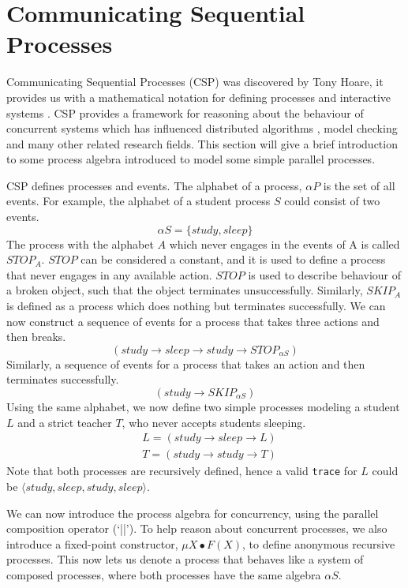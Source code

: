 \section{Communicating Sequential Processes} \label{csp_section}
Communicating Sequential Processes (CSP) was discovered by Tony Hoare, it provides us with a mathematical notation for defining processes and interactive systems \cite{csp_paper}. CSP provides a framework for reasoning about the behaviour of concurrent systems which has influenced distributed algorithms \cite{distributed_algorithms_na_lynch}, model checking \cite{model_checking} and many other related research fields. This section will give a brief introduction to some process algebra introduced to model some simple parallel processes.
\par
CSP defines processes and events. The alphabet of a process, $\alpha P$ is the set of all events. For example, the alphabet of a student process $S$ could consist of two events.
\[
\alpha S = \{study, sleep\}
\]
The process with the alphabet $A$ which never engages in the events of A is called $STOP_A$. $STOP$ can be considered a constant, and it is used to define a process that never engages in any available action. $STOP$ is used to describe behaviour of a broken object, such that the object terminates unsuccessfully. Similarly, $SKIP_A$ is defined as a process which does nothing but terminates successfully. We can now construct a sequence of events for a process that takes three actions and then breaks.
\[
(study \rightarrow sleep \rightarrow study \rightarrow STOP_{\alpha S})
\]
Similarly, a sequence of events for a process that takes an action and then terminates successfully.
\[
(study \rightarrow SKIP_{\alpha S})
\]
Using the same alphabet, we now define two simple processes modeling a student $L$ and a strict teacher $T$, who never accepts students sleeping.
\[
\begin{aligned}
& L = (study \rightarrow sleep \rightarrow L) \\
& T = (study \rightarrow study \rightarrow T) 
\end{aligned}
\]
Note that both processes are recursively defined, hence a valid \texttt{trace} for $L$ could be $\langle study, sleep, study, sleep \rangle$.
\par
We can now introduce the process algebra for concurrency, using the parallel composition operator (`||'). To help reason about concurrent processes, we also introduce a fixed-point constructor, $\mu X \bullet F(X)$, to define anonymous recursive processes. This now lets us denote a process that behaves like a system of composed processes, where both processes have the same algebra $\alpha S$.
